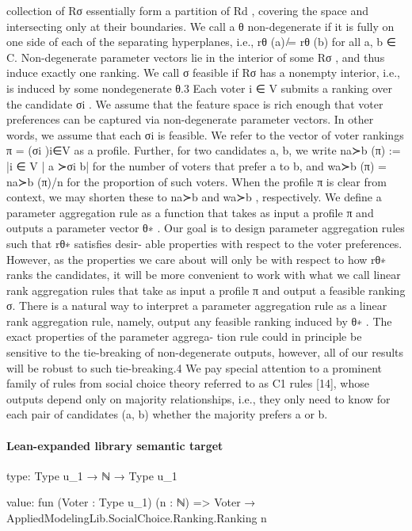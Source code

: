 \documentclass[10pt]{article}
\begin{document}
\begin{ReviewVerbatim}
collection of {Rσ } essentially form a partition of Rd , covering the space and intersecting only at
their boundaries.
We call a θ non-degenerate if it is fully on one side of each of the separating hyperplanes, i.e.,
rθ (a) ̸= rθ (b) for all a, b ∈ C. Non-degenerate parameter vectors lie in the interior of some Rσ ,
and thus induce exactly one ranking. We call σ feasible if Rσ has a nonempty interior, i.e., is induced
by some nondegenerate θ.3
Each voter i ∈ V submits a ranking over the candidate σi . We assume that the feature space is
rich enough that voter preferences can be captured via non-degenerate parameter vectors. In other
words, we assume that each σi is feasible. We refer to the vector of voter rankings π = (σi )i∈V as
a profile. Further, for two candidates a, b, we write na≻b (π) := |{i ∈ V | a ≻σi b}| for the number
of voters that prefer a to b, and wa≻b (π) = na≻b (π)/n for the proportion of such voters. When the
profile π is clear from context, we may shorten these to na≻b and wa≻b , respectively.
We define a parameter aggregation rule as a function that takes as input a profile π and outputs a
parameter vector θ∗ . Our goal is to design parameter aggregation rules such that rθ∗ satisfies desir-
able properties with respect to the voter preferences. However, as the properties we care about will
only be with respect to how rθ∗ ranks the candidates, it will be more convenient to work with what
we call linear rank aggregation rules that take as input a profile π and output a feasible ranking σ.
There is a natural way to interpret a parameter aggregation rule as a linear rank aggregation rule,
namely, output any feasible ranking induced by θ∗ . The exact properties of the parameter aggrega-
tion rule could in principle be sensitive to the tie-breaking of non-degenerate outputs, however, all
of our results will be robust to such tie-breaking.4
We pay special attention to a prominent family of rules from social choice theory referred to as C1
rules [14], whose outputs depend only on majority relationships, i.e., they only need to know for
each pair of candidates (a, b) whether the majority prefers a or b.
\end{ReviewVerbatim}



\paragraph{Lean-expanded library semantic target}
\begin{ReviewVerbatim}
type:
Type u_1 → ℕ → Type u_1

value:
fun (Voter : Type u_1) (n : ℕ) => Voter → AppliedModelingLib.SocialChoice.Ranking.Ranking n
\end{ReviewVerbatim}
\end{document}
